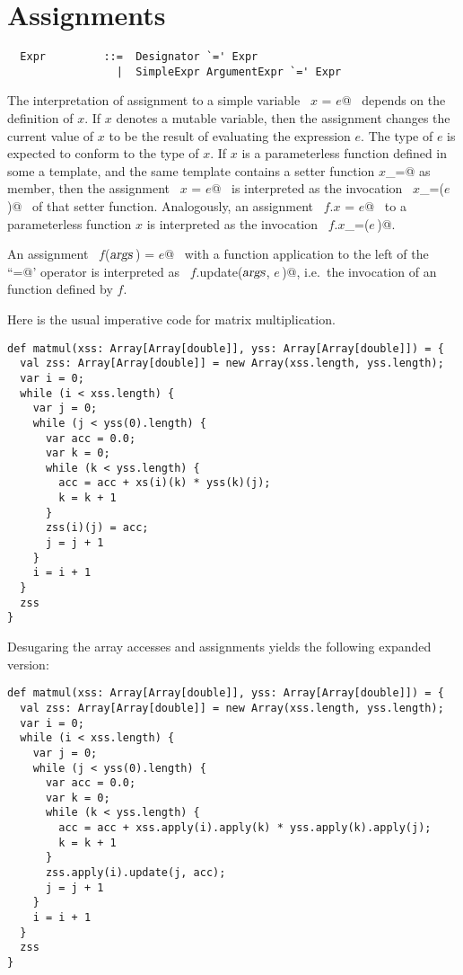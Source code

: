 \documentclass[a4paper,12pt,twoside,titlepage]{book}
\newcommand{\args}{\mbox{\sl args}}
\begin{document}
\section{Assignments}

\syntax\begin{lstlisting}
  Expr         ::=  Designator `=' Expr
                 |  SimpleExpr ArgumentExpr `=' Expr
\end{lstlisting}

The interpretation of assignment to a simple variable ~\lstinline@$x$ = $e$@~
depends on the definition of $x$. If $x$ denotes a mutable
variable, then the assignment changes the current value of $x$ to be
the result of evaluating the expression $e$. The type of $e$ is
expected to conform to the type of $x$. If $x$ is a parameterless
function defined in some a template, and the same template contains a
setter function \lstinline@$x$_=@ as member, then the assignment
~\lstinline@$x$ = $e$@~ is interpreted as the invocation
~\lstinline@$x$_=($e\,$)@~ of that setter function.  Analogously, an
assignment ~\lstinline@$f$.$x$ = $e$@~ to a parameterless function $x$
is interpreted as the invocation ~\lstinline@$f$.$x$_=($e\,$)@.

An assignment ~\lstinline@$f$($\args\,$) = $e$@~ with a function application to the
left of the ``\lstinline@=@' operator is interpreted as 
~\lstinline@$f$.update($\args$, $e\,$)@, i.e.\
the invocation of an  function defined by $f$.

\example \label{ex:imp-mat-mul}
Here is the usual imperative code for matrix multiplication.

\begin{lstlisting}
def matmul(xss: Array[Array[double]], yss: Array[Array[double]]) = {
  val zss: Array[Array[double]] = new Array(xss.length, yss.length);
  var i = 0;
  while (i < xss.length) {
    var j = 0;
    while (j < yss(0).length) {
      var acc = 0.0;
      var k = 0;
      while (k < yss.length) {
        acc = acc + xs(i)(k) * yss(k)(j);
        k = k + 1
      }
      zss(i)(j) = acc;
      j = j + 1
    }
    i = i + 1
  }
  zss
}
\end{lstlisting}
Desugaring the array accesses and assignments yields the following
expanded version:
\begin{lstlisting}
def matmul(xss: Array[Array[double]], yss: Array[Array[double]]) = {
  val zss: Array[Array[double]] = new Array(xss.length, yss.length);
  var i = 0;
  while (i < xss.length) {
    var j = 0;
    while (j < yss(0).length) {
      var acc = 0.0;
      var k = 0;
      while (k < yss.length) {
        acc = acc + xss.apply(i).apply(k) * yss.apply(k).apply(j);
        k = k + 1
      }
      zss.apply(i).update(j, acc);
      j = j + 1
    }
    i = i + 1
  }
  zss
}
\end{lstlisting}
\end{document}
